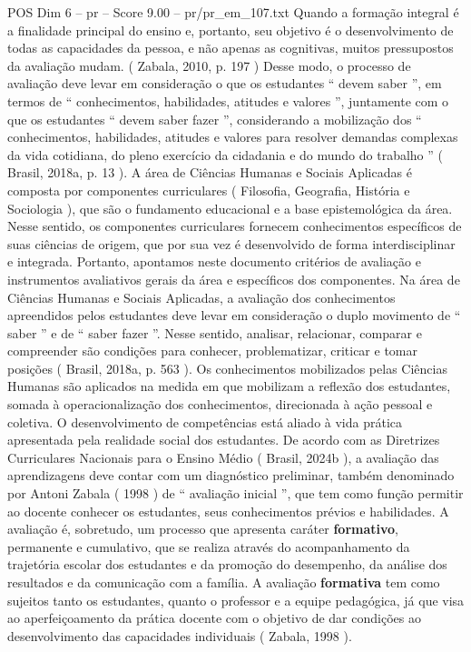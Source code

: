 \begin{textsample}{POS Dim 6 – pr – Score 9.00 – pr/pr\_em\_107.txt}
Quando a formação integral é a finalidade principal do ensino e, portanto, seu objetivo é o desenvolvimento de todas as capacidades da pessoa, e não apenas as cognitivas, muitos pressupostos da avaliação mudam. ( Zabala, 2010, p. 197 ) Desse modo, o processo de avaliação deve levar em consideração o que os estudantes “ devem saber ”, em termos de “ conhecimentos, habilidades, atitudes e valores ”, juntamente com o que os estudantes “ devem saber fazer ”, considerando a mobilização dos “ conhecimentos, habilidades, atitudes e valores para resolver demandas complexas da vida cotidiana, do pleno exercício da cidadania e do mundo do trabalho ” ( Brasil, 2018a, p. 13 ).
A área de Ciências Humanas e Sociais Aplicadas é composta por componentes curriculares ( Filosofia, Geografia, História e Sociologia ), que são o fundamento educacional e a base epistemológica da área.
Nesse sentido, os componentes curriculares fornecem conhecimentos específicos de suas ciências de origem, que por sua vez é desenvolvido de forma interdisciplinar e integrada.
Portanto, apontamos neste documento critérios de avaliação e instrumentos avaliativos gerais da área e específicos dos componentes.
Na área de Ciências Humanas e Sociais Aplicadas, a avaliação dos conhecimentos apreendidos pelos estudantes deve levar em consideração o duplo movimento de “ saber ” e de “ saber fazer ”.
Nesse sentido, analisar, relacionar, comparar e compreender são condições para conhecer, problematizar, criticar e tomar posições ( Brasil, 2018a, p. 563 ).
Os conhecimentos mobilizados pelas Ciências Humanas são aplicados na medida em que mobilizam a reflexão dos estudantes, somada à operacionalização dos conhecimentos, direcionada à ação pessoal e coletiva.
O desenvolvimento de competências está aliado à vida prática apresentada pela realidade social dos estudantes.
De acordo com as Diretrizes Curriculares Nacionais para o Ensino Médio ( Brasil, 2024b ), a avaliação das aprendizagens deve contar com um diagnóstico preliminar, também denominado por Antoni Zabala ( 1998 ) de “ avaliação inicial ”, que tem como função permitir ao docente conhecer os estudantes, seus conhecimentos prévios e habilidades.
A avaliação é, sobretudo, um processo que apresenta caráter \textbf{formativo}, permanente e cumulativo, que se realiza através do acompanhamento da trajetória escolar dos estudantes e da promoção do desempenho, da análise dos resultados e da comunicação com a família.
A avaliação \textbf{formativa} tem como sujeitos tanto os estudantes, quanto o professor e a equipe pedagógica, já que visa ao aperfeiçoamento da prática docente com o objetivo de dar condições ao desenvolvimento das capacidades individuais ( Zabala, 1998 ).

\end{textsample}
